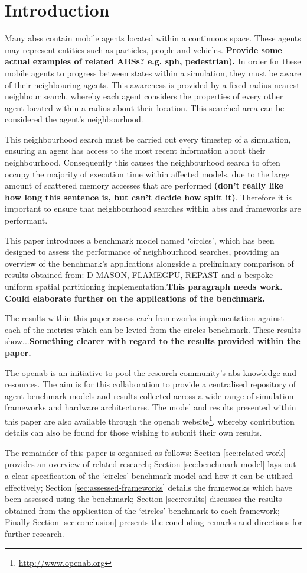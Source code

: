 
\section{Introduction}
  Many \glspl{abs} contain mobile agents located within a continuous space. These agents may represent entities such as particles, people and vehicles. \textbf{Provide some actual examples of related ABSs? e.g. sph, pedestrian).} In order for these mobile agents to progress between states within a simulation, they must be aware of their neighbouring agents. This awareness is provided by a fixed radius nearest neighbour search, whereby each agent considers the properties of every other agent located within a radius about their location. This searched area can be considered the agent's neighbourhood.
  
  This neighbourhood search must be carried out every timestep of a simulation, ensuring an agent has access to the most recent information about their neighbourhood. Consequently this causes the neighbourhood search to often occupy the majority of execution time within affected models, due to the large amount of scattered memory accesses that are performed \textbf{ (don't really like how long this sentence is, but can't decide how split it)}. Therefore it is important to ensure that neighbourhood searches within \glspl{abs} and frameworks are performant.
  
  This paper introduces a benchmark model named `circles', which has been designed to assess the performance of neighbourhood searches, providing an overview of the benchmark's applications alongside a preliminary comparison of results obtained from: D-MASON, FLAMEGPU, REPAST and a bespoke uniform spatial partitioning implementation.\textbf{This paragraph needs work. }\textbf{Could elaborate further on the applications of the benchmark.}
  
  The results within this paper assess each frameworks implementation against each of the metrics which can be levied from the circles benchmark. These results show...\textbf{Something clearer with regard to the results provided within the paper.}
  
  The \gls{openab} is an initiative to pool the research community's \gls{abs} knowledge and resources. The aim is for this collaboration to provide a centralised repository of agent benchmark models and results collected across a wide range of simulation frameworks and hardware architectures. The model and results presented within this paper are also available through the \gls{openab} website\footnote{\url{http://www.openab.org}}, whereby contribution details can also be found for those wishing to submit their own results.
  
  The remainder of this paper is organised as follows: Section \ref{sec:related-work} provides an overview of related research; Section \ref{sec:benchmark-model} lays out a clear specification of the `circles' benchmark model and how it can be utilised effectively; Section \ref{sec:assessed-frameworks} details the frameworks which have been assessed using the benchmark; Section \ref{sec:results} discusses the results obtained from the application of the `circles' benchmark to each framework; Finally Section \ref{sec:conclusion} presents the concluding remarks and directions for further research.
